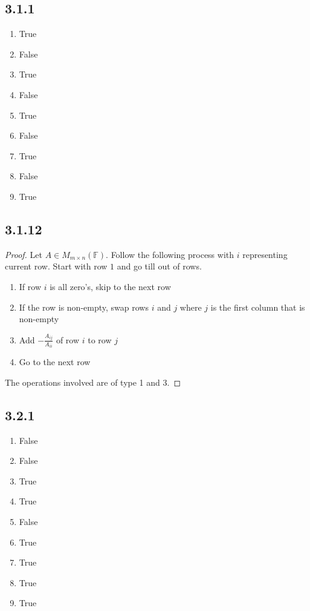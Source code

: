 \documentclass[12pt,titlepage]{extarticle}
\begin{document}
\subsection*{3.1.1}
\begin{enumerate}[label=\alph*)]
    \item True
    \item False
    \item True
    \item False
    \item True
    \item False
    \item True
    \item False
    \item True
\end{enumerate}

\subsection*{3.1.12}
\begin{proof}
    Let $A \in M_{m\times n} (\mathbb{F})$. Follow the following process with $i$ representing current row. Start with row $1$ and go till out of rows.
    \begin{enumerate}
        \item If row $i$ is all zero's, skip to the next row
        \item If the row is non-empty, swap rows $i$ and $j$ where $j$ is the first column that is non-empty
        \item Add $-\frac{A_{ij}}{A_{ii}}$ of row $i$ to row $j$
        \item Go to the next row
    \end{enumerate}
    The operations involved are of type 1 and 3.
\end{proof}

\subsection*{3.2.1}
\begin{enumerate}[label=\alph*)]
    \item False
    \item False
    \item True
    \item True
    \item False
    \item True
    \item True
    \item True
    \item True
\end{enumerate}
\end{document}
